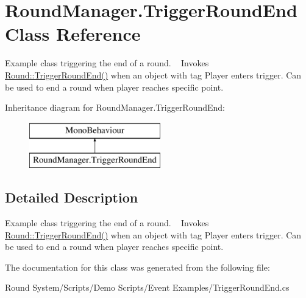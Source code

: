 \hypertarget{class_round_manager_1_1_trigger_round_end}{}\section{Round\+Manager.\+Trigger\+Round\+End Class Reference}
\label{class_round_manager_1_1_trigger_round_end}


Example class triggering the end of a round. ~\newline
Invokes \hyperlink{class_round_manager_1_1_round_a920b20ddeb67d8ab4dc68ae956db459f}{Round\+::\+Trigger\+Round\+End()} when an object with tag \textquotesingle{}Player\textquotesingle{} enters trigger. Can be used to end a round when player reaches specific point.  


Inheritance diagram for Round\+Manager.\+Trigger\+Round\+End\+:\begin{figure}[H]
\begin{center}
\leavevmode
\includegraphics[height=2.000000cm]{class_round_manager_1_1_trigger_round_end}
\end{center}
\end{figure}


\subsection{Detailed Description}
Example class triggering the end of a round. ~\newline
Invokes \hyperlink{class_round_manager_1_1_round_a920b20ddeb67d8ab4dc68ae956db459f}{Round\+::\+Trigger\+Round\+End()} when an object with tag \textquotesingle{}Player\textquotesingle{} enters trigger. Can be used to end a round when player reaches specific point. 



The documentation for this class was generated from the following file\+:\begin{DoxyCompactItemize}
\item 
Round System/\+Scripts/\+Demo Scripts/\+Event Examples/Trigger\+Round\+End.\+cs\end{DoxyCompactItemize}
